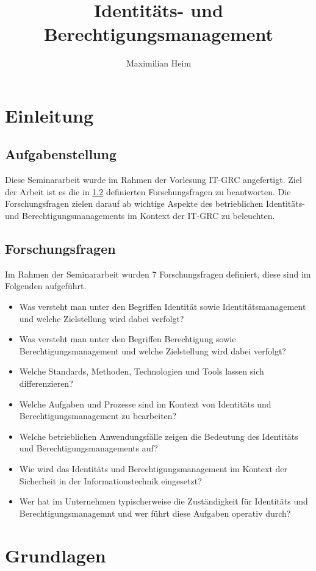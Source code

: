 \documentclass[12pt]{article}
\author{Maximilian Heim}
\title{Identitäts- und Berechtigungsmanagement}
\begin{document}
\maketitle
\newpage
\tableofcontents
\newpage
\section{Einleitung}
\subsection{Aufgabenstellung}
Diese Seminararbeit wurde im Rahmen der Vorlesung IT-GRC angefertigt. Ziel der Arbeit ist es die in \cref{subsec:forschungsfragen} definierten Forschungsfragen zu beantworten. Die Forschungsfragen zielen darauf ab wichtige Aspekte des betrieblichen Identitäts- und Berechtigungsmanagements im Kontext der IT-GRC zu beleuchten.
\subsection{Forschungsfragen}
\label{subsec:forschungsfragen}
Im Rahmen der Seminararbeit wurden 7 Forschungsfragen definiert, diese sind im Folgenden aufgeführt.
\begin{itemize}
  \item Was versteht man unter den Begriffen \glqq{}Identität\grqq{} sowie \glqq{}Identitätsmanagement\grqq{} und welche Zielstellung wird dabei verfolgt?
  \item Was versteht man unter den Begriffen \glqq{}Berechtigung\grqq{} sowie \glqq{}Berechtigungsmanagement\grqq{} und welche Zielstellung wird dabei verfolgt?
  \item Welche Standards, Methoden, Technologien und Tools lassen sich differenzieren?
  \item Welche Aufgaben und Prozesse sind im Kontext von Identitäts und Berechtigungsmanagement zu bearbeiten?
  \item Welche betrieblichen Anwendungsfälle zeigen die Bedeutung des Identitäts und Berechtigungsmanagements auf?
  \item Wie wird das Identitäts und Berechtigungsmanagement im Kontext der Sicherheit in der Informationstechnik eingesetzt?
  \item Wer hat im Unternehmen typischerweise die Zuständigkeit für Identitäts und Berechtigungsmanagemnt und wer führt diese Aufgaben operativ durch?
\end{itemize}
\section{Grundlagen}
\label{sec:grundlagen}
\end{document}
